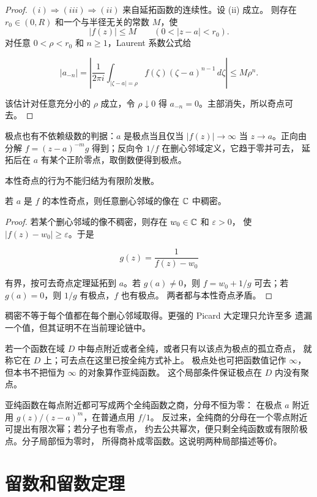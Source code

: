 \begin{proof}
\((i)\Rightarrow(iii)\Rightarrow(ii)\) 来自延拓函数的连续性。设 (ii) 成立。
则存在 \(r_0\in(0,R)\) 和一个与半径无关的常数 \(M\)，使
\[
 |f(z)|\le M\qquad(0<|z-a|<r_0).
\]
对任意 \(0<\rho<r_0\) 和 \(n\ge1\)，Laurent 系数公式给

\[
 |a_{-n}|
 =\left|\frac1{2\pi i}\int_{|\zeta-a|=\rho}
 f(\zeta)(\zeta-a)^{n-1}\,d\zeta\right|
 \le M\rho^n.
\]

该估计对任意充分小的 \(\rho\) 成立，令 \(\rho\downarrow0\) 得
\(a_{-n}=0\)。主部消失，所以奇点可去。
\end{proof}

极点也有不依赖级数的判据：\(a\) 是极点当且仅当
\(|f(z)|\to\infty\) 当 \(z\to a\)。正向由分解
\(f=(z-a)^{-m}g\) 得到；反向令 \(1/f\) 在删心邻域定义，它趋于零并可去，
延拓后在 \(a\) 有某个正阶零点，取倒数便得到极点。

本性奇点的行为不能归结为有限阶发散。

\begin{theorem}
\label{thm:casorati-weierstrass}
若 \(a\) 是 \(f\) 的本性奇点，则任意删心邻域的像在 \(\mathbb{C}\) 中稠密。
\end{theorem}

\begin{proof}
若某个删心邻域的像不稠密，则存在 \(w_0\in\mathbb{C}\) 和 \(\varepsilon>0\)，
使 \(|f(z)-w_0|\ge\varepsilon\)。于是

\[
 g(z)=\frac1{f(z)-w_0}
\]

有界，按可去奇点定理延拓到 \(a\)。若 \(g(a)\ne0\)，则
\(f=w_0+1/g\) 可去；若 \(g(a)=0\)，则 \(1/g\) 有极点，\(f\) 也有极点。
两者都与本性奇点矛盾。
\end{proof}

稠密不等于每个值都在每个删心邻域取得。更强的 Picard 大定理只允许至多
遗漏一个值，但其证明不在当前理论链中。

若一个函数在域 \(D\) 中每点附近或者全纯，或者只有以该点为极点的孤立奇点，
就称它在 \(D\) 上；可去点在这里已按全纯方式补上。
极点处也可把函数值记作 \(\infty\)，但本书不把恒为 \(\infty\) 的对象算作亚纯函数。
这个局部条件保证极点在 \(D\) 内没有聚点。

亚纯函数在每点附近都可写成两个全纯函数之商，分母不恒为零：
在极点 \(a\) 附近用 \(g(z)/(z-a)^m\)，在普通点用 \(f/1\)。
反过来，全纯商的分母在一个零点附近可提出有限次幂；若分子也有零点，
约去公共幂次，便只剩全纯函数或有限阶极点。分子局部恒为零时，
所得商补成零函数。这说明两种局部描述等价。

\section{留数和留数定理}

